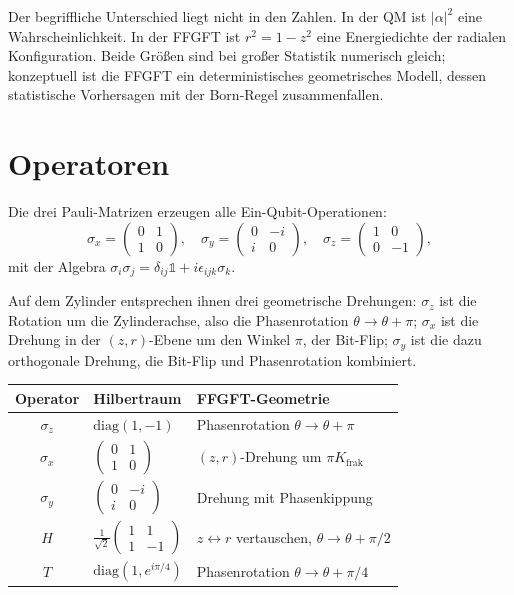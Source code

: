 Der begriffliche Unterschied liegt nicht in den Zahlen. In der QM ist
$|\alpha|^2$ eine Wahrscheinlichkeit. In der FFGFT ist $r^2 = 1-z^2$
eine Energiedichte der radialen Konfiguration. Beide Größen sind bei
großer Statistik numerisch gleich; konzeptuell ist die FFGFT ein
deterministisches geometrisches Modell, dessen statistische Vorhersagen
mit der Born-Regel zusammenfallen.

\section{Operatoren}

Die drei Pauli-Matrizen erzeugen alle Ein-Qubit-Operationen:
\begin{equation}
  \sigma_x = \begin{pmatrix}0&1\\1&0\end{pmatrix},\quad
  \sigma_y = \begin{pmatrix}0&-i\\i&0\end{pmatrix},\quad
  \sigma_z = \begin{pmatrix}1&0\\0&-1\end{pmatrix},
\end{equation}
mit der Algebra $\sigma_i\sigma_j = \delta_{ij}\mathbb{1}+i\epsilon_{ijk}\sigma_k$.

Auf dem Zylinder entsprechen ihnen drei geometrische Drehungen:
$\sigma_z$ ist die Rotation um die Zylinderachse, also die Phasenrotation
$\theta\to\theta+\pi$; $\sigma_x$ ist die Drehung in der $(z,r)$-Ebene um
den Winkel $\pi$, der Bit-Flip; $\sigma_y$ ist die dazu orthogonale
Drehung, die Bit-Flip und Phasenrotation kombiniert.

\begin{center}
\small\renewcommand{\arraystretch}{1.5}
\begin{tabular}{cp{2.6cm}p{3.6cm}}
\toprule
\textbf{Operator} & \textbf{Hilbertraum} & \textbf{FFGFT-Geometrie} \\
\midrule
$\sigma_z$ & $\mathrm{diag}(1,-1)$ & Phasenrotation $\theta\to\theta+\pi$ \\
$\sigma_x$ & $\begin{pmatrix}0&1\\1&0\end{pmatrix}$ & $(z,r)$-Drehung um $\pi K_{\mathrm{frak}}$ \\
$\sigma_y$ & $\begin{pmatrix}0&-i\\i&0\end{pmatrix}$ & Drehung mit Phasenkippung \\
$H$ & $\frac{1}{\sqrt2}\begin{pmatrix}1&1\\1&-1\end{pmatrix}$ & $z\leftrightarrow r$ vertauschen, $\theta\to\theta+\pi/2$ \\
$T$ & $\mathrm{diag}(1,e^{i\pi/4})$ & Phasenrotation $\theta\to\theta+\pi/4$ \\
\bottomrule
\end{tabular}
\end{center}

